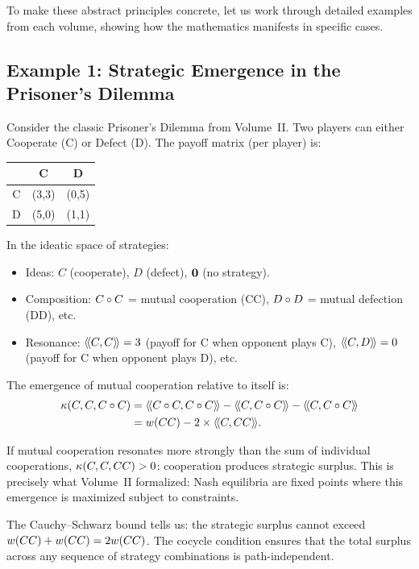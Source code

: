 To make these abstract principles concrete, let us work through detailed
examples from each volume, showing how the mathematics manifests in specific
cases.

\subsection{Example 1: Strategic Emergence in the Prisoner's Dilemma}

Consider the classic Prisoner's Dilemma from Volume~II. Two players can
either Cooperate (C) or Defect (D). The payoff matrix (per player) is:

\begin{center}
\begin{tabular}{c|cc}
& C & D \\
\hline
C & (3,3) & (0,5) \\
D & (5,0) & (1,1) \\
\end{tabular}
\end{center}

In the ideatic space of strategies:
\begin{itemize}
  \item Ideas: $C$ (cooperate), $D$ (defect), $\mathbf{0}$ (no strategy).
  \item Composition: $C \circ C$ = mutual cooperation (CC), $D \circ D$ =
    mutual defection (DD), etc.
  \item Resonance: $\langle\!\langle C, C \rangle\!\rangle = 3$ (payoff for C when opponent plays C),
    $\langle\!\langle C, D \rangle\!\rangle = 0$ (payoff for C when opponent plays D), etc.
\end{itemize}

The emergence of mutual cooperation relative to itself is:
\begin{align*}
\emerge(C, C, C \compose C)
&= \rs{C \compose C}{C \compose C} - \rs{C}{C \compose C} - \rs{C}{C \compose C} \\
&= \weight{CC} - 2 \times \rs{C}{CC}.
\end{align*}

If mutual cooperation resonates more strongly than the sum of individual
cooperations, $\kappa(C,C,CC) > 0$: cooperation produces strategic surplus.
This is precisely what Volume~II formalized: Nash equilibria are fixed points
where this emergence is maximized subject to constraints.

The Cauchy--Schwarz bound tells us: the strategic surplus cannot exceed
$w(CC) + w(CC) = 2w(CC)$. The cocycle condition ensures that
the total surplus across any sequence of strategy combinations is path-independent.

